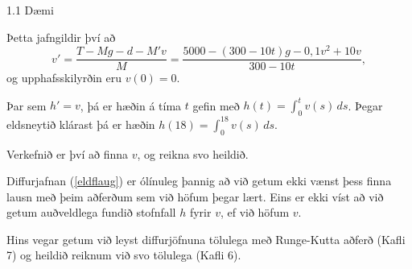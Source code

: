 \begin{frame}{1.1 Dæmi}

\begin{block}{}
Þetta jafngildir því að 
\begin{equation}
v' = \frac{T-Mg-d-M'v}{M} = \frac{5000-(300-10t)g-0,1v^2+10v}{300-10t},
\label{eldflaug}
\end{equation}\pause
og upphafsskilyrðin eru $v(0) =0$.

\pause\smallskip
Þar sem $h' = v$, \pause þá er hæðin á tíma $t$ gefin með 
$h(t) =\int_0^t v(s)\, ds$. \pause 
Þegar eldsneytið klárast þá er hæðin $h(18) = \int_0^{18} v(s)\, ds$.

\pause\smallskip
Verkefnið er því að finna $v$, og reikna svo heildið.

\pause\smallskip
Diffurjafnan (\ref{eldflaug}) er ólínuleg þannig að við getum ekki vænst þess 
finna lausn með þeim aðferðum sem við höfum þegar lært. 
Eins er ekki víst að við getum auðveldlega fundið stofnfall $h$ fyrir
$v$, ef við höfum $v$.

\pause\smallskip
Hins vegar getum við leyst diffurjöfnuna tölulega með Runge-Kutta aðferð (Kafli 7)
og heildið reiknum við svo tölulega (Kafli 6).
 \end{block}

\end{frame}


% 
% 
% 


